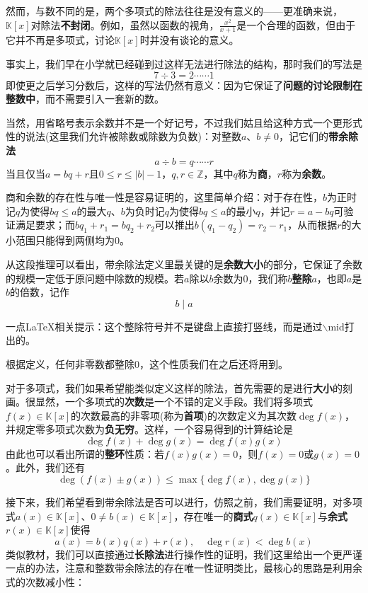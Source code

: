 \documentclass[a4paper,UTF8,fontset=windows,AutoFakeBold]{ctexart}
\newcommand*{\note}{\noindent *}
\begin{document}
然而，与数不同的是，两个多项式的除法往往是没有意义的——更准确来说，$\mathbb{K}[x]$对除法\textbf{不封闭}。例如，虽然以函数的视角，$\frac{x^2}{x+1}$是一个合理的函数，但由于它并不再是多项式，讨论$\mathbb{K}[x]$时并没有谈论的意义。

事实上，我们早在小学就已经碰到过这样无法进行除法的结构，那时我们的写法是
$$7\div3=2\cdots\cdots1$$
即使更之后学习分数后，这样的写法仍然有意义：因为它保证了\textbf{问题的讨论限制在整数中}，而不需要引入一套新的数。

当然，用省略号表示余数并不是一个好记号，不过我们姑且给这种方式一个更形式性的说法(这里我们允许被除数或除数为负数)：对整数$a$、$b\ne0$，记它们的\textbf{带余除法}
$$a\div b=q\cdots\cdots r$$
当且仅当$a=bq+r$且$0\le r\le |b|-1$，$q,r\in\mathbb{Z}$，其中$q$称为\textbf{商}，$r$称为\textbf{余数}。

商和余数的存在性与唯一性是容易证明的，这里简单介绍：对于存在性，$b$为正时记$q$为使得$bq\le a$的最大$q$、$b$为负时记$q$为使得$bq\le a$的最小$q$，并记$r=a-bq$可验证满足要求；而$bq_1+r_1=bq_2+r_2$可以推出$b(q_1-q_2)=r_2-r_1$，从而根据$r$的大小范围只能得到两侧均为0。

从这段推理可以看出，带余除法定义里最关键的是\textbf{余数大小}的部分，它保证了余数的规模一定低于原问题中除数的规模。若$a$除以$b$余数为0，我们称$b$\textbf{整除}$a$，也即$a$是$b$的倍数，记作
$$b\mid a$$

\note 一点\LaTeX 相关提示：这个整除符号并不是键盘上直接打竖线，而是通过$\backslash$mid打出的。

\note 根据定义，任何非零数都整除0，这个性质我们在之后还将用到。

对于多项式，我们如果希望能类似定义这样的除法，首先需要的是进行\textbf{大小}的刻画。很显然，一个多项式的\textbf{次数}是一个不错的定义手段。我们将多项式$f(x)\in\mathbb{K}[x]$的次数最高的非零项(称为\textbf{首项})的次数定义为其次数$\deg f(x)$，并规定零多项式次数为\textbf{负无穷}。这样，一个容易得到的计算结论是
$$\deg f(x)+\deg g(x)=\deg f(x)g(x)$$
由此也可以看出所谓的\textbf{整环}性质：若$f(x)g(x)=0$，则$f(x)=0$或$g(x)=0$。此外，我们还有
$$\deg(f(x)\pm g(x))\le\max\{\deg f(x),\deg g(x)\}$$

接下来，我们希望看到带余除法是否可以进行，仿照之前，我们需要证明，对多项式$a(x)\in\mathbb{K}[x]$、$0\ne b(x)\in\mathbb{K}[x]$，存在唯一的\textbf{商式}$q(x)\in\mathbb{K}[x]$与\textbf{余式}$r(x)\in\mathbb{K}[x]$使得
$$a(x)=b(x)q(x)+r(x),\quad\deg r(x)<\deg b(x)$$
类似教材，我们可以直接通过\textbf{长除法}进行操作性的证明，我们这里给出一个更严谨一点的办法，注意和整数带余除法的存在唯一性证明类比，最核心的思路是利用余式的次数减小性：
\end{document}
